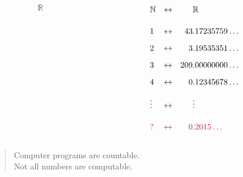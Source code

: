 \documentclass{beamer}
\begin{document}
\begin{frame}
  \begin{columns}
    \begin{column}{0.3\textwidth}
      \color{gmitblue} \fontsize{60}{10}
      \[\mathbb{R}\]
    \end{column}
    {\color{gmitgrey!30}\vrule{}} \hspace{0.1\textwidth}
    \begin{column}{0.5\textwidth}
      \begin{align*}
        &\mathbb{N} &\leftrightarrow& &&\mathbb{R} \\[4mm]
        &1 &\leftrightarrow& &43&.17235759\ldots \\[2mm]
        &2 &\leftrightarrow& &3&.19535351\ldots \\[2mm]
        &3 &\leftrightarrow& &209&.00000000\ldots \\[2mm]
        &4 &\leftrightarrow& &0&.12345678\ldots \\[2mm]
        &\vdots &\leftrightarrow& &&\vdots \\[4mm]
        &{\color{gmitred}?} &{\color{gmitred}\leftrightarrow}& &{\color{gmitred}0}&{\color{gmitred}.2015\ldots}
      \end{align*}
    \end{column}
  \end{columns}
\end{frame}


\begin{frame}[standout]
  \begin{quote}
    Computer programs are countable. \\[8mm]
    Not all numbers are computable.
  \end{quote}
\end{frame} 
\end{document}

